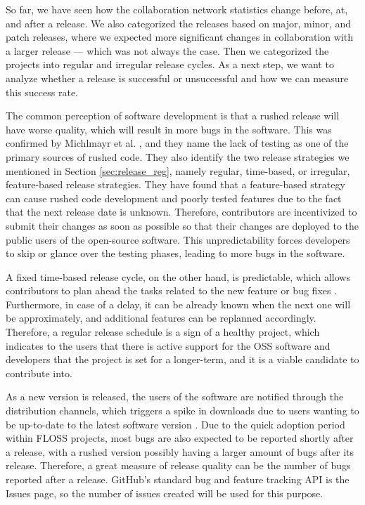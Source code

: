 So far, we have seen how the collaboration network statistics change before, at, and after a release. We also categorized the releases based on major, minor, and patch releases, where we expected more significant changes in collaboration with a larger release — which was not always the case. Then we categorized the projects into regular and irregular release cycles. As a next step, we want to analyze whether a release is successful or unsuccessful and how we can measure this success rate.

The common perception of software development is that a rushed release will have worse quality, which will result in more bugs in the software. This was confirmed by Michlmayr et al. \cite{michlmayrWhyHowShould2015}, and they name the lack of testing as one of the primary sources of rushed code. They also identify the two release strategies we mentioned in Section \ref{sec:release_reg}, namely regular, time-based, or irregular, feature-based release strategies. They have found that a feature-based strategy can cause rushed code development and poorly tested features due to the fact that the next release date is unknown. Therefore, contributors are incentivized to submit their changes as soon as possible so that their changes are deployed to the public users of the open-source software. This unpredictability forces developers to skip or glance over the testing phases, leading to more bugs in the software.

A fixed time-based release cycle, on the other hand, is predictable, which allows contributors to plan ahead the tasks related to the new feature or bug fixes \cite{michlmayrWhyHowShould2015}. Furthermore, in case of a delay, it can be already known when the next one will be approximately, and additional features can be replanned accordingly. Therefore, a regular release schedule is a sign of a healthy project, which indicates to the users that there is active support for the OSS software and developers that the project is set for a longer-term, and it is a viable candidate to contribute into.

As a new version is released, the users of the software are notified through the distribution channels, which triggers a spike in downloads due to users wanting to be up-to-date to the latest software version \cite{khomhFasterReleasesImprove2012}. Due to the quick adoption period within FLOSS projects, most bugs are also expected to be reported shortly after a release, with a rushed version possibly having a larger amount of bugs after its release. Therefore, a great measure of release quality can be the number of bugs reported after a release. GitHub's standard bug and feature tracking API is the Issues page, so the number of issues created will be used for this purpose. 

